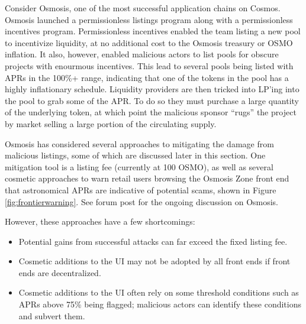             Consider Osmosis, one of the most successful application chains on Cosmos. Osmosis launched a permissionless listings program along with a permissionless incentives program. Permissionless incentives enabled the team listing a new pool to incentivize liquidity, at no additional cost to the Osmosis treasury or OSMO inflation. It also, however, enabled malicious actors to list pools for obscure projects with enourmous incentives. This lead to several pools being listed with APRs in the 100\%+ range, indicating that one of the tokens in the pool has a highly inflationary schedule. Liquidity providers are then tricked into LP'ing into the pool to grab some of the APR. To do so they must purchase a large quantity of the underlying token, at which point the malicious sponsor ``rugs'' the project by market selling a large portion of the circulating supply.

            Osmosis has considered several approaches to mitigating the damage from malicious listings, some of which are discussed later in this section. One mitigation tool is a listing fee (currently at 100 OSMO), as well as several cosmetic approaches to warn retail users browsing the Osmosis Zone front end that astronomical APRs are indicative of potential scams, shown in Figure \ref{fig:frontierwarning}. See   forum post for the ongoing discussion on Osmosis.
            
            However, these approaches have a few shortcomings:
            
            \begin{itemize}
                \item Potential gains from successful attacks can far exceed the fixed listing fee.
                \item Cosmetic additions to the UI may not be adopted by all front ends if front ends are decentralized.
                \item Cosmetic additions to the UI often rely on some threshold conditions such as APRs above 75\% being flagged; malicious actors can identify these conditions and subvert them.
            \end{itemize}
            
